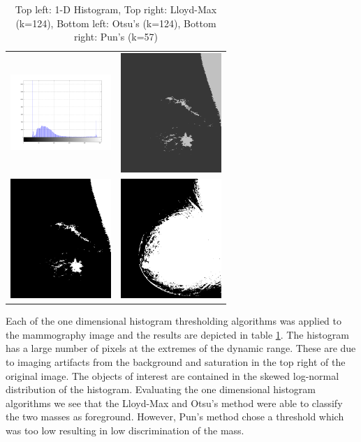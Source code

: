 \documentclass[journal]{IEEEtran}
\begin{document}
\begin{table}[!h]
\centering
\begin{tabular}{cc}
\includegraphics[width=1.5in]{../results/breast_hist.png} &
\includegraphics[width=1.5in]{../results/breast_lloydmax.png} \\
\newline
\includegraphics[width=1.5in]{../results/breast_otsu.png} &
\includegraphics[width=1.5in]{../results/breast_pun.png} \\
\end{tabular}
\caption{Top left: 1-D Histogram, Top right: Lloyd-Max (k=124), Bottom left: Otsu's (k=124), Bottom right: Pun's (k=57)}
\label{tab:breastTable1}
\end{table}

\par Each of the one dimensional histogram thresholding algorithms was applied to the mammography image and the results are depicted in table \ref{tab:breastTable1}. The histogram has a large number of pixels at the extremes of the dynamic range. These are due to imaging artifacts from the background and saturation in the top right of the original image. The objects of interest are contained in the skewed log-normal distribution of the histogram. Evaluating the one dimensional histogram algorithms we see that the Lloyd-Max and Otsu's method were able to classify the two masses as foreground. However, Pun's method chose a threshold which was too low resulting in low discrimination of the mass.
\end{document}
